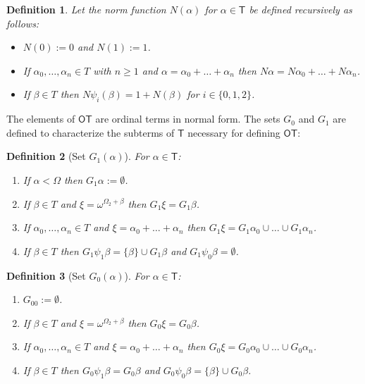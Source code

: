 \documentclass{amsart}
\theoremstyle{plain}
\theoremstyle{plain}
\newtheorem*{definition}{Definition}
\newcommand\T{\mathsf{T}}
\newcommand\OT{\mathsf{OT}}
\newcommand{\Om}{{\Omega}}
\newcommand{\al}{{\alpha}}
\newcommand{\be}{{\beta}}
\newcommand{\om}{\omega}
\begin{document}
\begin{definition} Let the norm function $N(\al)$ for $\al \in \T$ be defined recursively as follows:
\begin{itemize}
    \item $N(0) := 0$ and $N(1):=1$.
    \item If $\al_0, \ldots , \al_n \in T$ with $n\geq 1$ and $\al=\al_0 +\ldots +\al_n$ then $N\al = N\al_0 +\ldots + N\al_n$.
    \item If $\be \in T$ then $N\psi_i(\be) = 1 +N(\be)$ for $i \in\{0,1,2\}$.
\end{itemize}
\end{definition}
\medskip

The elements of $\OT$ are ordinal terms in normal form. The sets $G_0$ and $G_1$  are defined to characterize the subterms of $\T$ necessary for defining $\OT$:
\begin{definition}[Set $G_1(\al)$]
For $\alpha \in \T$:
\begin{enumerate}
    \item If $\al<\Om$ then $G_1\al:=\emptyset$.
    \item If $\be \in T$ and $\xi = \om^{\Om_2 +\be }$ then $G_1\xi = G_1\be$.
    \item If $\al_0,\ldots,\al_n \in T$ and $\xi=\al_0+\ldots+\al_n$ then $G_1\xi = G_1\al_0 \cup  \ldots \cup G_1\al_n$.
    \item If $\be\in T$ then $G_1 \psi_1 \be=\{\be\}\cup G_1\be$ and  $G_1 \psi_0 \be=\emptyset$.
\end{enumerate}
\end{definition}

\begin{definition}[Set $G_0(\al)$]
For $\alpha \in \T$:
\begin{enumerate}
    \item $G_00:=\emptyset$.
    \item If $\be \in T$ and $\xi = \om^{\Om_2 +\be }$ then $G_0\xi = G_0\be$.
    \item If $\al_0,\ldots,\al_n \in T$ and $\xi=\al_0+\ldots+\al_n$ then $G_0\xi = G_0\al_0 \cup  \ldots \cup G_0\al_n$.
    \item If $\be\in T$  then $G_0 \psi_1\be=G_0\be$ and $G_0 \psi_0 \be=\{\be\}\cup G_0\be$.
\end{enumerate}
\end{definition}
\smallskip

\end{document}
